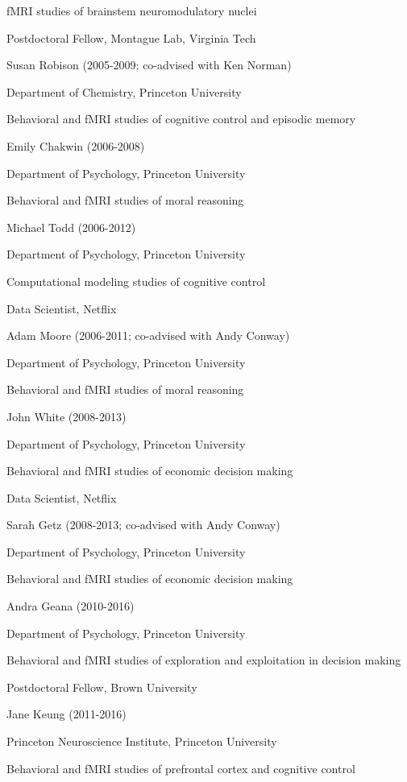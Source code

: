 \documentclass[10 pt]{article}
\begin{document}
fMRI studies of brainstem neuromodulatory nuclei

Postdoctoral Fellow, Montague Lab, Virginia Tech
    \medskip

Susan Robison (2005-2009; co-advised with Ken Norman)

Department of Chemistry, Princeton University

Behavioral and fMRI studies of cognitive control and episodic memory
    \medskip

Emily Chakwin (2006-2008)

Department of Psychology, Princeton University

Behavioral and fMRI studies of moral reasoning
    \medskip

Michael Todd (2006-2012)

Department of Psychology, Princeton University

Computational modeling studies of cognitive control

Data Scientist, Netflix
    \medskip

Adam Moore (2006-2011; co-advised with Andy Conway)

Department of Psychology, Princeton University

Behavioral and fMRI studies of moral reasoning
    \medskip

John White (2008-2013)

Department of Psychology, Princeton University

Behavioral and fMRI studies of economic decision making

Data Scientist, Netflix
    \medskip

Sarah Getz (2008-2013; co-advised with Andy Conway)

Department of Psychology, Princeton University

Behavioral and fMRI studies of economic decision making
    \medskip

Andra Geana (2010-2016)

Department of Psychology, Princeton University

Behavioral and fMRI studies of exploration and exploitation in decision making

Postdoctoral Fellow, Brown University
    \medskip

Jane Keung (2011-2016)

Princeton Neuroscience Institute, Princeton University

Behavioral and fMRI studies of prefrontal cortex and cognitive control
\end{document}
